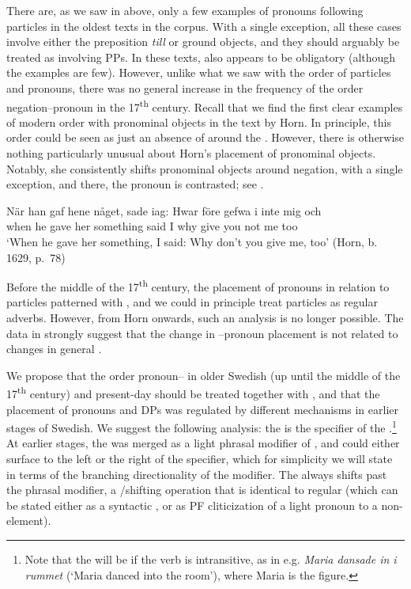 \documentclass[output=paper]{langscibook}
\begin{document}
There are, as we saw in  above, only a few examples of pronouns following particles in the oldest texts in the corpus. With a single exception, all these cases involve either the preposition \textit{till} or ground objects, and they should arguably be treated as involving PPs. In these texts,  also appears to be obligatory (although the examples are few). However, unlike what we saw with the order of particles and pronouns, there was no general increase in the frequency of the order negation–pronoun in the 17\textsuperscript{th} century. Recall that we find the first clear examples of modern  order with pronominal objects in the text by Horn. In principle, this order could be seen as just an absence of  around the . However, there is otherwise nothing particularly unusual about Horn’s placement of pronominal objects. Notably, she consistently shifts pronominal objects around negation, with a single exception, and there, the pronoun is contrasted; see .\largerpage


\ea\label{ex:lalu:52}
\gll  När       han  gaf   hene   någet,       sade   iag:   {Hwar före} gefwa   i     inte   mig   och\\
when    he   gave   her   something   said   I       why   give     you   not   me   too\\
\glt `When he gave her something, I said: Why don’t you give me, too’ (Horn, b. 1629, p.~78)\\
\z


Before the middle of the 17\textsuperscript{th} century, the placement of pronouns in relation to particles patterned with , and we could in principle treat particles as regular adverbs. However, from Horn onwards, such an analysis is no longer possible. The data in  strongly suggest that the change in –pronoun placement is not related to changes in general .



We propose that the order pronoun– in older Swedish (up until the middle of the 17\textsuperscript{th} century) and present-day  should be treated together with , and that the placement of pronouns and DPs was regulated by different mechanisms in earlier stages of Swedish. We suggest the following analysis: the  is the specifier of the .\footnote{Note that the  will be  if the verb is intransitive, as in e.g. \textit{Maria dansade in i rummet} (‘Maria danced into the room’), where Maria is the figure.} At earlier stages, the  was merged as a light phrasal modifier of , and could either surface to the left or the right of the specifier, which for simplicity we will state in terms of the branching directionality of the modifier. The  always shifts past the phrasal modifier, a /shifting operation that is identical to regular  (which can be stated either as a syntactic , or as PF cliticization of a light pronoun to a non- element). 
\end{document}
